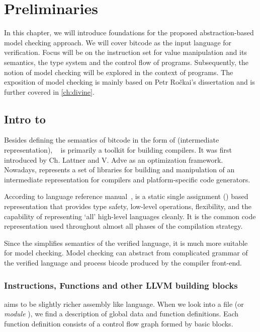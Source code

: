 \chapter{Preliminaries}\label{ch:preliminaries}

In this chapter, we will introduce foundations for the proposed
abstraction-based model checking approach. We will cover \LLVM bitcode as the
input language for verification. Focus will be on the instruction set for
value manipulation and its semantics, the \LLVM type system and the control flow
of programs. Subsequently, the notion of model checking will be explored in
the context of \LLVM programs. The exposition of model checking is mainly based on
Petr Ročkai's dissertation \cite{Rockai15} and is further covered in \autoref{ch:divine}.

\section{Intro to \LLVMIR} \label{sec:introtollvm}

Besides defining the semantics of bitcode in the form of \LLVMIR (intermediate
representation), \LLVM{}~\cite{LLVM:web} is primarily a toolkit for building
compilers. It was first introduced by Ch. Lattner and V. Adve \cite{Lattner04}
as an optimization framework. Nowadays, \LLVM represents a set of libraries for
building and manipulation of an intermediate representation for compilers and
platform-specific code generators.

According to \LLVM language reference manual~\cite{LLVM:langref},
\LLVM is a static single assignment (\SSA) based representation that
provides type safety, low-level operations, flexibility, and
the capability of representing ‘all’ high-level languages cleanly. It is the
common code representation used throughout almost all phases of the \LLVM compilation
strategy.

Since the \LLVMIR simplifies semantics of the verified language, it is much more
suitable for model checking. Model checking can abstract from complicated
grammar of the verified language and process \LLVM bicode produced by the compiler
front-end.

\subsection{Instructions, Functions and other LLVM building blocks} \label{subsec:infnllvm}
\LLVMIR aims to be slightly richer assembly like language. When we look
into a \LLVMIR file (or \emph{module}
), we find a description of global
data and function definitions. Each function definition consists of a control flow graph
formed by basic blocks.

